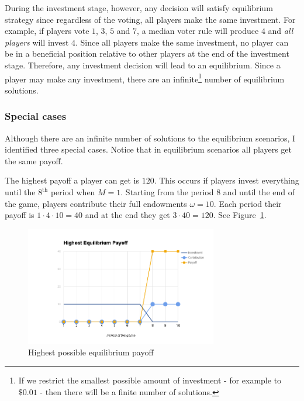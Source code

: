 			During the investment stage, however, any decision will satisfy equilibrium strategy since regardless of the voting, all players make the same investment. For example, if players vote $1$, $3$, $5$ and $7$, a median voter rule will produce $4$ and \emph{all players} will invest $4$. Since all players make the same investment, no player can be in a beneficial position relative to other players at the end of the investment stage. Therefore, any investment decision will lead to an equilibrium. Since a player may make any investment, there are an infinite\footnote{If we restrict the smallest possible amount of investment - for example to $\$0.01$ - then there will be a finite number of solutions.} number of equilibrium solutions.

		\subsubsection{Special cases}

			Although there are an infinite number of solutions to the equilibrium scenarios, I identified three special cases. Notice that in equilibrium scenarios all players get the same payoff.

			The highest payoff a player can get is $120$. This occurs if players invest everything until the $8^\text{th}$ period when $M = 1$. Starting from the period $8$ and until the end of the game, players contribute their full endowments $\omega = 10$. Each period their payoff is $1 \cdot 4 \cdot 10 = 40$ and at the end they get $3 \cdot 40 = 120$. See Figure~\ref{fig:nash-highest}.

			\begin{figure}
				\begin{center}
					\includegraphics[width=8.4cm]{resources/nash-highest.png}
					\caption{Highest possible equilibrium payoff} 
					\label{fig:nash-highest}
				\end{center}
			\end{figure}

